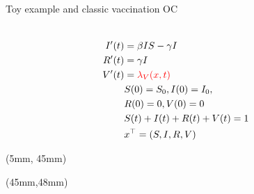 \begin{frame}{Toy example and classic vaccination OC}
\begin{textblock*}{65mm}
{\begin{equation*}
\begin{aligned}
                   \\
                   I'(t) &=  \beta IS - \gamma I
                   \\
                   R'(t) & = \gamma I
                   \\
                   V'(t) & = \textcolor{red}{\lambda_V(x,t)}
                   \\
                   & S(0) = S_0, I(0)=I_0, 
                   \\
                   &R(0)=0, V(0)=0
                   \\
                   & S(t) + I(t) + R(t) + V(t)= 1
                   \\
                   & x^{\top}=(S,I,R,V)
                \end{aligned}
            \end{equation*}
        }
     \end{textblock*}
     \begin{textblock*}{28mm}(5mm, 45mm)
    \end{textblock*}

     \begin{textblock*}{80mm}(45mm,48mm)
     \end{textblock*}
 \end{frame}
